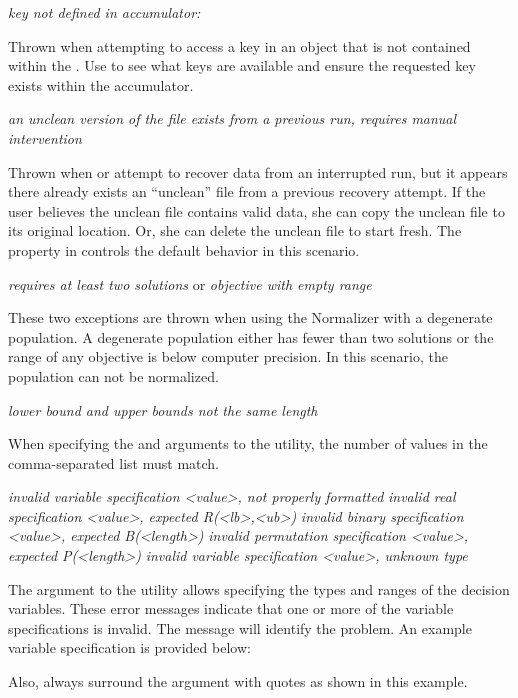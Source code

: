 \noindent
\textit{key not defined in accumulator: }
\begin{indented}
  Thrown when attempting to access a key in an  object that is not contained within the .  Use  to see what keys are available and ensure the requested key exists within the accumulator.
\end{indented}

\noindent
\textit{an unclean version of the file exists from a previous run, requires manual intervention}
\begin{indented}
  Thrown when  or  attempt to recover data from an interrupted run, but it appears there already exists an ``unclean'' file from a previous recovery attempt.  If the user believes the unclean file contains valid data, she can copy the unclean file to its original location.  Or, she can delete the unclean file to start fresh.  The  property in  controls the default behavior in this scenario.
\end{indented}

\noindent
\textit{requires at least two solutions} or
\textit{objective with empty range}
\begin{indented}
  These two exceptions are thrown when using the Normalizer with a degenerate population.  A degenerate population either has fewer than two solutions or the range of any objective is below computer precision.  In this scenario, the population can not be normalized.
\end{indented}

\noindent
\textit{lower bound and upper bounds not the same length}
\begin{indented}
  When specifying the  and  arguments to the  utility, the number of values in the comma-separated list must match.
\end{indented}

\noindent
\textit{invalid variable specification <value>, not properly formatted}
\textit{invalid real specification <value>, expected R(<lb>,<ub>)}
\textit{invalid binary specification <value>, expected B(<length>)}
\textit{invalid permutation specification <value>, expected P(<length>)}
\textit{invalid variable specification <value>, unknown type}
\begin{indented}
  The  argument to the  utility allows specifying the types and ranges of the decision variables.  These error messages indicate that one or more of the variable specifications is invalid.  The message will identify the problem.  An example variable specification is provided below:
  \begin{indented}
  \end{indented}
  Also, always surround the argument with quotes as shown in this example.
\end{indented}

